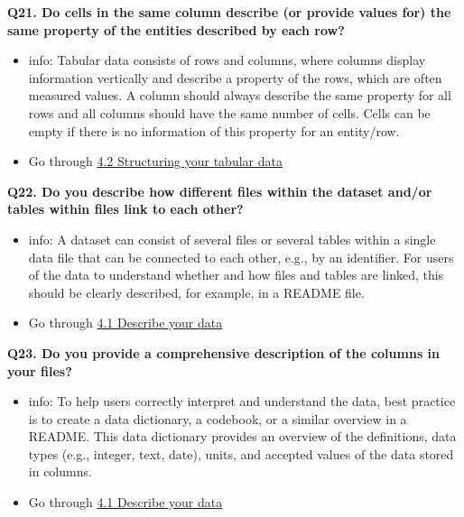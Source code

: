 \documentclass[
]{book}
\providecommand{\tightlist}{%
  \setlength{\itemsep}{0pt}\setlength{\parskip}{0pt}}
\begin{document}
\textbf{Q21. Do cells in the same column describe (or provide values for) the same property of the entities described by each row?}

\begin{itemize}
\tightlist
\item
  info: Tabular data consists of rows and columns, where columns display information vertically and describe a property of the rows, which are often measured values. A column should always describe the same property for all rows and all columns should have the same number of cells. Cells can be empty if there is no information of this property for an entity/row.
\item
  Go through \protect\hyperlink{structuring-your-tabular-data}{4.2 Structuring your tabular data}
\end{itemize}

\textbf{Q22. Do you describe how different files within the dataset and/or tables within files link to each other?}

\begin{itemize}
\tightlist
\item
  info: A dataset can consist of several files or several tables within a single data file that can be connected to each other, e.g., by an identifier. For users of the data to understand whether and how files and tables are linked, this should be clearly described, for example, in a README file.
\item
  Go through \protect\hyperlink{describe-data}{4.1 Describe your data}
\end{itemize}

\textbf{Q23. Do you provide a comprehensive description of the columns in your files?}

\begin{itemize}
\tightlist
\item
  info: To help users correctly interpret and understand the data, best practice is to create a data dictionary, a codebook, or a similar overview in a README. This data dictionary provides an overview of the definitions, data types (e.g., integer, text, date), units, and accepted values of the data stored in columns.
\item
  Go through \protect\hyperlink{describe-data}{4.1 Describe your data}
\end{itemize}
\end{document}
